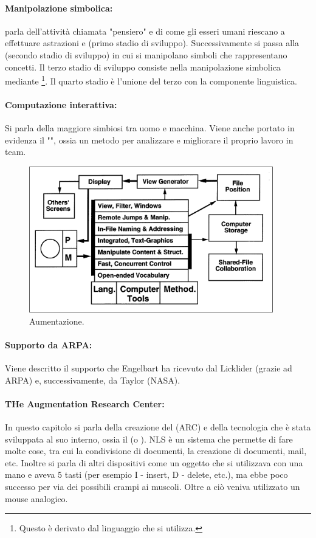 \paragraph{Manipolazione simbolica:} parla dell'attività chiamata "pensiero" e di come gli esseri
umani riescano a effettuare astrazioni e  (primo stadio di sviluppo).
Successivamente si passa alla  (secondo stadio di sviluppo) in cui si manipolano
simboli che rappresentano concetti. Il terzo stadio di sviluppo consiste nella manipolazione simbolica mediante \footnote{Questo 
è derivato dal linguaggio che si utilizza.
}. Il quarto stadio è l'unione del terzo con la componente linguistica.

\paragraph{Computazione interattiva:} Si parla della maggiore simbiosi tra uomo e macchina. Viene anche portato in evidenza il
"", ossia un metodo per analizzare e migliorare il proprio lavoro in team.

\begin{figure}
    \centering
    \includegraphics[scale=0.5]{images/Au.png}
    \caption{Aumentazione.}
\end{figure}

\paragraph{Supporto da ARPA:} Viene descritto il supporto che Engelbart ha ricevuto dal Licklider (grazie ad ARPA) e, successivamente,
da Taylor (NASA).

\paragraph{THe Augmentation Research Center:} In questo capitolo si parla della creazione del  (ARC) e 
della tecnologia che è stata sviluppata al suo interno, ossia il  (o ).
NLS è un sistema che permette di fare molte cose, tra cui la condivisione di documenti, la creazione di documenti, mail, etc.
Inoltre si parla di altri dispositivi come un oggetto che si utilizzava con una mano e aveva 5 tasti (per esempio I - insert, D - delete, etc.), ma ebbe poco successo per via dei
possibili crampi ai muscoli. Oltre a ciò veniva utilizzato un mouse analogico.

